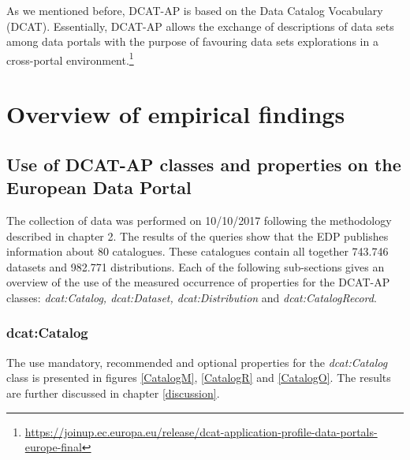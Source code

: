 \documentclass[<options>]{elsarticle}
\begin{document}
As we mentioned before, DCAT-AP is based on the Data Catalog Vocabulary (DCAT). Essentially, DCAT-AP allows the exchange of descriptions of data sets among data portals with the purpose of favouring data sets explorations in a cross-portal environment.\footnote{\href{DCAT Application Profile for Data Portals in Europe}{https://joinup.ec.europa.eu/release/dcat-application-profile-data-portals-europe-final}}

\section{Overview of empirical findings}
\subsection{Use of DCAT-AP classes and properties on the European Data Portal} \label{EDPUse}
The collection of data was performed on 10/10/2017 following the methodology described in chapter 2. The results of the queries show that the EDP publishes information about 80 catalogues. These catalogues contain all together 743.746 datasets and 982.771 distributions. Each of the following sub-sections gives an overview of the use of the measured occurrence of properties for the DCAT-AP classes: \textit{dcat:Catalog, dcat:Dataset, dcat:Distribution} and \textit{dcat:CatalogRecord}.
\subsubsection{dcat:Catalog}
The use mandatory, recommended and optional properties for the \textit{dcat:Catalog} class is presented in figures \ref{CatalogM}, \ref{CatalogR} and \ref{CatalogO}. The results are further discussed in chapter \ref{discussion}.
\end{document}
